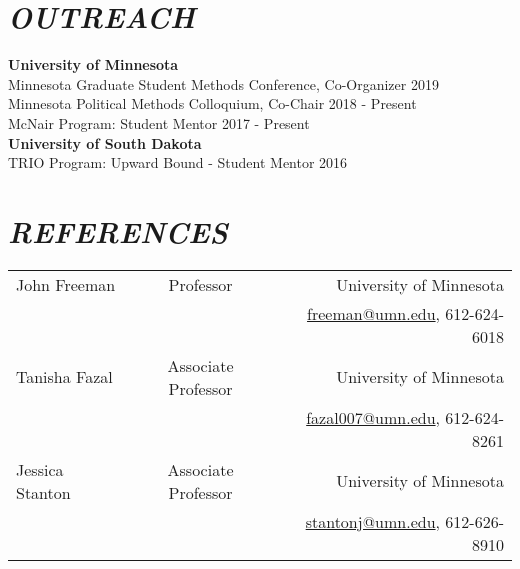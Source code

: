 \documentclass[margin, 10pt]{res} %
\begin{document}
\begin{resume}

\section{\footnotesize \textit{OUTREACH}}
\textbf{University of Minnesota}\\
\-\hspace{5mm} Minnesota Graduate Student Methods Conference, Co-Organizer \hfill 2019\\
\-\hspace{5mm} Minnesota Political Methods Colloquium, Co-Chair \hfill 2018 - Present\\
\-\hspace{5mm} McNair Program: Student Mentor \hfill 2017 - Present\\
\textbf{University of South Dakota}\\
\-\hspace{5mm} TRIO Program: Upward Bound - Student Mentor \hfill 2016


\section{\footnotesize \textit{REFERENCES}}
\begin{table}[!h]
	\begin{footnotesize}
	\begin{tabular*}{1\linewidth}{@{\extracolsep{\fill}}lcr}
		John Freeman & Professor & University of Minnesota\\
		& & \textcolor{blue}{\href{mailto:freeman@umn.edu}{freeman@umn.edu}}, 612-624-6018 \vspace{1.5mm}\\
		
		Tanisha Fazal & Associate Professor & University of Minnesota\\
		& & \textcolor{blue}{\href{mailto:fazal007@umn.edu}{fazal007@umn.edu}}, 612-624-8261 \vspace{1.5mm}\\
		
		Jessica Stanton & Associate Professor & University of Minnesota\\
		& & \textcolor{blue}{\href{mailto:stantonj@umn.edu}{stantonj@umn.edu}}, 612-626-8910 \vspace{1.5mm}\\
		

\end{tabular*}
\end{footnotesize}
\end{table}
\end{resume}
\end{document}
